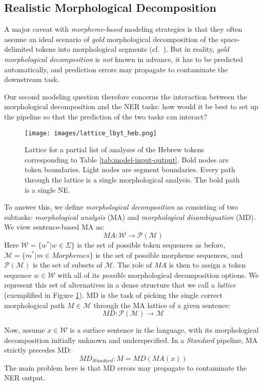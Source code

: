 \documentclass[11pt,a4paper]{article}
\newcommand{\YAPMACRO}{{\em Standard}\xspace}
\begin{document}
\subsection{Realistic Morphological Decomposition} 
A major caveat with  {\em morpheme-based} modeling strategies 
is that they often assume an ideal scenario of {\em gold} morphological decomposition of the  space-delimited tokens  into morphological segments (cf.\  
\citet{nivre-etal-2007-conll, pradhan-etal-2012-conll}).
But in  reality,
 {\em gold morphological decomposition} is  {\em not} known in advance, it has to be predicted automatically, and prediction errors may  propagate to contaminate the downstream task.

Our second modeling question therefore concerns the interaction between the morphological decomposition and the NER tasks:   how would it be best to set up the pipeline so that the prediction of the two tasks can interact?

\begin{figure}[t]
\centering
  \texttt{[image: images/lattice\_lbyt\_heb.png]}
  \caption{\label{fig:lattice} 
  Lattice for a partial list of analyses of the Hebrew tokens  corresponding to Table \ref{tab:model-input-output}. Bold nodes are token boundaries. Light nodes are segment boundaries. Every path through the lattice is a single morphological analysis. The bold path is a single NE.  }
\end{figure}

To answer this, we define  \emph{morphological decomposition} as consisting of two subtasks:  {\em morphological analysis} (MA) and {\em morphological disambiguation} (MD). We view sentence-based MA as:  
\[ MA : \mathcal{W} \rightarrow \mathcal{P(M)}\]
Here \(\mathcal{W} = \{w^*| w\in \Sigma\}\) is the set of  possible token sequences as before,  \(\mathcal{M} = \{m^*| m\in Morphemes\}\) is the set of possible morpheme sequences, and
\(\mathcal{P(M)}\) is the set of subsets of \(\mathcal{M}\). 
The role of \(MA\) is then to assign a token sequence  \(w\in\mathcal{W}\) with all of its {\em possible} morphological decomposition options. We represent this set of alternatives  in a dense structure  that we call a \emph{lattice} (exemplified in Figure \ref{fig:lattice}). 
MD is  the task of picking the single correct morphological path \(M\in\mathcal{M}\) through the MA lattice 
of a given sentence:
\[ MD : \mathcal{P(M)} \rightarrow \mathcal{M}\]
 
Now, assume \(x\in\mathcal{W}\) is a surface sentence in the language, with its morphological decomposition initially unknown and underspecified. 
In a  \YAPMACRO pipeline, MA strictly precedes MD: 
        \[MD_\textit{Standard}: M=MD(MA(x))\]
The main problem here is that MD errors  may propagate to contaminate the NER output.
\end{document}
